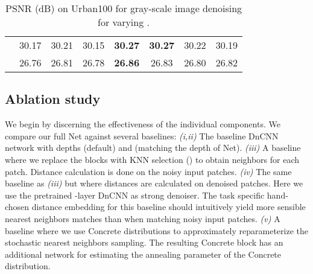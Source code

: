 \documentclass{article}
\begin{document}
\begin{table}[b]
	\vspace{-0.5em}
	\caption{PSNR (dB) on Urban100 for gray-scale image denoising for varying .}
	\label{tab:k_exp}
	\footnotesize
	\centering
	\smallskip
	\begin{tabularx}{\linewidth}{@{} X S[table-format=2.2] @{\hspace{1cm}} S[table-format=2.2] @{\hspace{1cm}} S[table-format=2.2] @{\hspace{1cm}} S[table-format=2.2] @{\hspace{1cm}} S[table-format=2.2] @{\hspace{1cm}} S[table-format=2.2] @{\hspace{1cm}} S[table-format=2.2]@{}}
		\toprule
					&{}	& {}	& {} 	& {}	&  {} 	& {} 	&  {}	\\
		\midrule
		 & 30.17 	& 30.21 	& 30.15		& \bfseries 30.27		& \bfseries 30.27		& 30.22		& 30.19  \\
		 & 26.76		& 26.81 	& 26.78		& \bfseries 26.86		& 26.83		& 26.80		& 26.82  \\
		\bottomrule
	\end{tabularx}
																\end{table}


\subsection{Ablation study}
\label{sec:experiments_ablation}
We begin by discerning the effectiveness of the individual components.
We compare our full Net against several baselines: 
\emph{(i,ii)} The baseline DnCNN network with depths  (default) and  (matching the depth of Net). 
\emph{(iii)} A baseline where we replace the  blocks with KNN selection () to obtain neighbors for each patch.
Distance calculation is done on the noisy input patches.
\emph{(iv)} The same baseline as \emph{(iii)} but where distances are calculated on denoised patches.
Here we use the pretrained -layer DnCNN as strong denoiser. 
The task specific hand-chosen distance embedding for this baseline should intuitively yield more sensible nearest neighbors matches than when matching noisy input patches.
\emph{(v)} A baseline where we use Concrete distributions \cite{Jang:2016:CRW,Maddison:2016:TCD} to approximately reparameterize the stochastic nearest neighbors sampling. 
The resulting Concrete block has an additional network for estimating the annealing parameter of the Concrete distribution.
\end{document}
